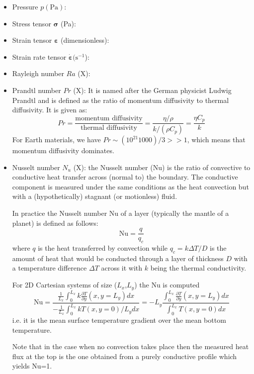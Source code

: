 \begin{itemize}
\item Pressure $p (\text{Pa})$:
\item Stress tensor ${\bm \sigma}$ (Pa): 
\item Strain tensor ${\bm \varepsilon}$ (dimensionless): 
\item Strain rate tensor $ \dot{\bm \varepsilon} (\text{s}^{-1}$): 
\item Rayleigh number $Ra$ (X): 
\item Prandtl number $Pr$ (X):  It is named after the German physicist 
Ludwig Prandtl and is defined as the ratio of momentum diffusivity to thermal diffusivity. It is given as: 
\[
Pr = \frac{\text{momentum diffusivity}}{\text{thermal diffusivity}} = \frac{\eta/\rho}{k/(\rho C_p)}= \frac{\eta C_p}{k}
\]
For Earth materials, we have $Pr \sim (10^{21} 1000)/3 >> 1$, which means that momentum diffusivity dominates.


\item Nusselt number $N_u$ (X):   the Nusselt number (Nu) is the ratio of convective to conductive heat transfer across (normal to) the boundary. The conductive component is measured under the same conditions as the heat convection but with a (hypothetically) stagnant (or motionless) fluid.

In practice the Nusselt number Nu of a layer (typically the mantle of a planet) is defined as follows:
\begin{equation}
\text{Nu} = \frac{q}{q_c}
\end{equation} 
where $q$ is the heat transferred by convection while $q_c=k \Delta T /D$ 
is the amount of heat that would be conducted through a layer of
thickness $D$ with a temperature difference $\Delta T$ across it with 
$k$ being the thermal conductivity.

For 2D Cartesian systems of size ($L_x$,$L_y$) the Nu is computed \cite{blbc89}
\[
\text{Nu} = 
 \frac{\frac{1}{L_x}\int_{0}^{L_x} k \frac{\partial T}{\partial y}(x,y=L_y) dx }
{-\frac{1}{L_x}\int_0^{L_x} k T(x,y=0) /L_y dx}
=-L_y \frac{\int_{0}^{L_x} \frac{\partial T}{\partial y}(x,y=L_y) dx }{\int_0^{L_x} T(x,y=0) dx}
\]
i.e. it is the mean surface temperature gradient
over the mean bottom temperature.


Note that in the case when no convection takes place then the measured heat flux at the top is 
the one obtained from a purely conductive profile which yields Nu=1.


\end{itemize}
